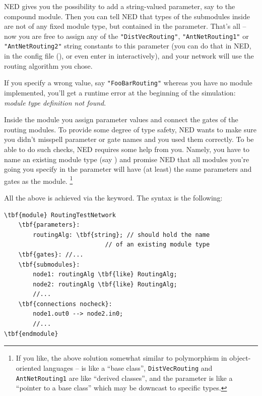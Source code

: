 NED gives you the possibility to add a string-valued parameter,
say  to the  compound module.
Then you can tell NED that types of the submodules inside 
are not of any fixed module type, but contained in the 
parameter. That's all -- now you are free to assign any of
the \texttt{"DistVecRouting"}, \texttt{"AntNetRouting1"} or
\texttt{"AntNetRouting2"} string constants to this parameter
(you can do that in NED, in the config file (),
or even enter in interactively),
and your network will use the routing algorithm you chose.

If you specify a wrong value, say \texttt{"FooBarRouting"}
whereas you have no  module implemented,
you'll get a runtime error at the beginning of the simulation:
\textit{module type definition not found}.

Inside the  module you assign parameter values
and connect the gates of the routing modules. To provide some degree
of type safety, NED wants to make sure you didn't misspell
parameter or gate names and you used them correctly.
To be able to do such checks, NED requires some help from you.
Namely, you have to name an existing module type (say )
and promise NED that all modules you're going you specify
in the  parameter will have (at least) the same
parameters and gates as the  module.
  \footnote{If you like, the above solution somewhat similar to polymorphism
  in object-oriented languages --  is like a
  ``base class'', \texttt{DistVecRouting} and \texttt{AntNetRouting1}
  are like ``derived classes'', and the  parameter
  is like a ``pointer to a base class'' which may be downcast to specific
  types.}

All the above is achieved via the  keyword.
The syntax is the following:

\begin{Verbatim}[commandchars=\\\{\}]
\tbf{module} RoutingTestNetwork
    \tbf{parameters}:
        routingAlg: \tbf{string}; // should hold the name
                            // of an existing module type
    \tbf{gates}: //...
    \tbf{submodules}:
        node1: routingAlg \tbf{like} RoutingAlg;
        node2: routingAlg \tbf{like} RoutingAlg;
        //...
    \tbf{connections nocheck}:
        node1.out0 --> node2.in0;
        //...
\tbf{endmodule}
\end{Verbatim}

